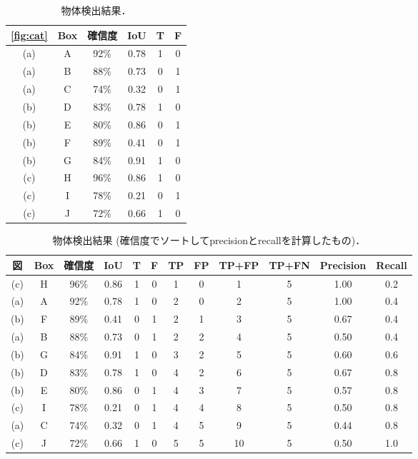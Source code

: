 \documentclass[originalpaper,fleqn]{jsaiart}     %
\begin{document}
\begin{table}
    \caption{物体検出結果．}
    \label{tbl:detect_cat}
    \centering
    \footnotesize
    \begin{tabular}{cccccc} 
        \toprule
        \ref{fig:cat} & Box & 確信度 & IoU & T & F \\ 
        \midrule
        (a) & A & 92\% & 0.78 & 1 & 0 \\ 
        (a) & B & 88\% & 0.73 & 0 & 1 \\ 
        (a) & C & 74\% & 0.32 & 0 & 1 \\ 
        (b) & D & 83\% & 0.78 & 1 & 0 \\ 
        (b) & E & 80\% & 0.86 & 0 & 1 \\ 
        (b) & F & 89\% & 0.41 & 0 & 1 \\ 
        (b) & G & 84\% & 0.91 & 1 & 0 \\ 
        (c) & H & 96\% & 0.86 & 1 & 0 \\ 
        (c) & I & 78\% & 0.21 & 0 & 1 \\ 
        (c) & J & 72\% & 0.66 & 1 & 0 \\ 
        \bottomrule
    \end{tabular}
\end{table}%
\begin{table}
    \caption{物体検出結果 (確信度でソートしてprecisionとrecallを計算したもの)．}
    \label{tbl:detect_cat_PR}
    \centering
    \setlength{\tabcolsep}{1pt}
    \footnotesize
    \begin{tabular}{cccccccccccc} 
        \toprule
        図 & Box & 確信度 & IoU & T & F & TP & FP & TP+FP & TP+FN & Precision & Recall \\ 
        \midrule
        (c) & H & 96\% & 0.86 & 1 & 0 & 1 & 0 & 1 & 5 & 1.00 & 0.2 \\ 
        (a) & A & 92\% & 0.78 & 1 & 0 & 2 & 0 & 2 & 5 & 1.00 & 0.4 \\ 
        (b) & F & 89\% & 0.41 & 0 & 1 & 2 & 1 & 3 & 5 & 0.67 & 0.4 \\ 
        (a) & B & 88\% & 0.73 & 0 & 1 & 2 & 2 & 4 & 5 & 0.50 & 0.4 \\ 
        (b) & G & 84\% & 0.91 & 1 & 0 & 3 & 2 & 5 & 5 & 0.60 & 0.6 \\ 
        (b) & D & 83\% & 0.78 & 1 & 0 & 4 & 2 & 6 & 5 & 0.67 & 0.8 \\ 
        (b) & E & 80\% & 0.86 & 0 & 1 & 4 & 3 & 7 & 5 & 0.57 & 0.8 \\ 
        (c) & I & 78\% & 0.21 & 0 & 1 & 4 & 4 & 8 & 5 & 0.50 & 0.8 \\ 
        (a) & C & 74\% & 0.32 & 0 & 1 & 4 & 5 & 9 & 5 & 0.44 & 0.8 \\ 
        (c) & J & 72\% & 0.66 & 1 & 0 & 5 & 5 & 10 & 5 & 0.50 & 1.0 \\ 
        \bottomrule
    \end{tabular}
\end{table}%
\end{document}
